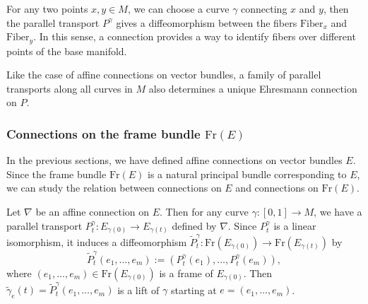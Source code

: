 For any two points $x,y\in M$, we can choose a curve $\gamma$ connecting $x$ and $y$, 
then the parallel transport $P^\gamma$ gives a diffeomorphism between the fibers $\mathrm{Fiber}_x$ and $\mathrm{Fiber}_y$. 
In this sense, a connection provides a way to identify fibers over different points of the base manifold. 

Like the case of affine connections on vector bundles, 
a family of parallel transports along all curves in $M$ also determines a unique Ehresmann connection on $P$.

\subsubsection{Connections on the frame bundle $\mathrm{Fr}(E)$}
In the previous sections, we have defined affine connections on vector bundles $E$. 
Since the frame bundle $\mathrm{Fr}(E)$ is a natural principal bundle corresponding to $E$, 
we can study the relation between connections on $E$ and connections on $\mathrm{Fr}(E)$. 

Let $\nabla$ be an affine connection on $E$. Then for any curve $\gamma: [0,1]\to M$, 
we have a parallel transport $P^\gamma_t: E_{\gamma(0)}\to E_{\gamma(t)}$ defined by $\nabla$. 
Since $P^\gamma_t$ is a linear isomorphism, 
it induces a diffeomorphism $\tilde{P}^\gamma_t: \mathrm{Fr}(E_{\gamma(0)})\to \mathrm{Fr}(E_{\gamma(t)})$ by
\begin{equation*}
    \tilde{P}^{\gamma}_t(e_1, \ldots, e_m) := (P^\gamma_t(e_1), \ldots, P^\gamma_t(e_m)),
\end{equation*}
where $(e_1, \ldots, e_m)\in \mathrm{Fr}(E_{\gamma(0)})$ is a frame of $E_{\gamma(0)}$.
Then $\tilde{\gamma}_e(t)=\tilde{P}^\gamma_t(e_1, \ldots, e_m)$ is a lift of $\gamma$ starting at $e=(e_1, \ldots, e_m)$. 

